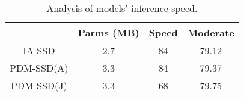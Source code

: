 

\begin{table}
	\centering
	\caption{Analysis of models' inference speed.}
	\begin{tabular}{c|ccc} 
		\toprule
		& Parms (MB) & Speed & Moderate  \\ 
		\hline
		IA-SSD     & 2.7        & 84    & 79.12     \\
		PDM-SSD(A) & 3.3        & 84    & 79.37     \\
		PDM-SSD(J) & 3.3        & 68    & 79.75     \\
		\bottomrule
	\end{tabular}
\label{tabel8}
\end{table}